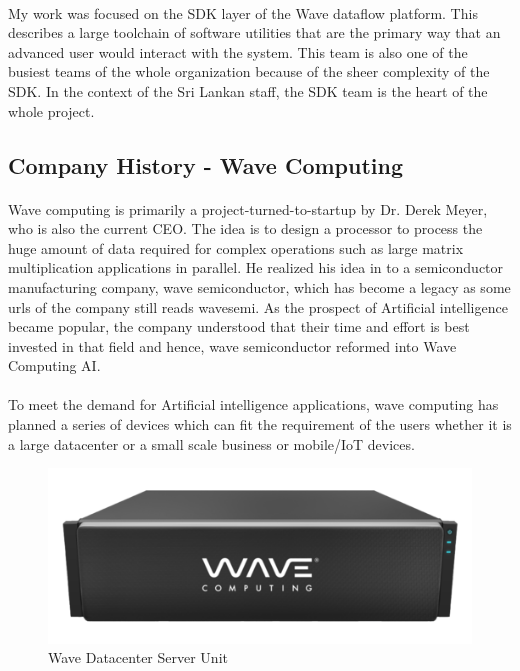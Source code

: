 \paragraph{}
My work was focused on the SDK layer of the Wave dataflow platform. This describes a large toolchain of software utilities that are the primary way that an advanced user would interact with the system. This team is also one of the busiest teams of the whole organization because of the sheer complexity of the SDK. In the context of the Sri Lankan staff, the SDK team is the heart of the whole project.


\subsection{Company History - Wave Computing}

\paragraph{}
Wave computing is primarily a project-turned-to-startup by Dr. Derek Meyer, who is also the current CEO. The idea is to design a processor to process the huge amount of data required for complex operations such as large matrix multiplication applications in parallel. He realized his idea in to a semiconductor manufacturing company, wave semiconductor, which has become a legacy as some urls of the company still reads wavesemi. As the prospect of Artificial intelligence became popular, the company understood that their time and effort is best invested in that field and hence, wave semiconductor reformed into Wave Computing AI.

\paragraph{}
To meet the demand for Artificial intelligence applications, wave computing has planned a series of devices which can fit the requirement of the users whether it is a large datacenter or a small scale business or mobile/{IoT} devices.
\begin{figure}[h]
    \centering
    \includegraphics[trim=0cm 0cm 0cm 0cm, clip=true,scale=0.5]{figures/wave_server.png}
    \caption{Wave Datacenter Server Unit\label{Fig:waveserver}}\vspace{-4mm}
    \end{figure}

